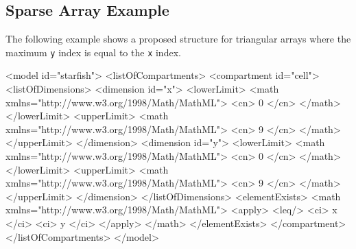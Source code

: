 \documentclass{cekarticle}
\begin{document}
\subsection{Sparse Array Example}
\label{sec:sparseeg}

The following example shows a proposed structure for triangular
arrays where the maximum \texttt{y} index is equal to the
\texttt{x} index.

\begin{example}
<model id="starfish">
    <listOfCompartments>
        <compartment id="cell">
            <listOfDimensions>
                <dimension id="x">
                    <lowerLimit>
                        <math xmlns="http://www.w3.org/1998/Math/MathML">
                            <cn> 0 </cn>
                        </math>
                    </lowerLimit>
                    <upperLimit>
                        <math xmlns="http://www.w3.org/1998/Math/MathML">
                            <cn> 9 </cn>
                        </math>
                    </upperLimit>
                </dimension>
                <dimension id="y">
                    <lowerLimit>
                        <math xmlns="http://www.w3.org/1998/Math/MathML">
                            <cn> 0 </cn>
                        </math>
                    </lowerLimit>
                    <upperLimit>
                        <math xmlns="http://www.w3.org/1998/Math/MathML">
                            <cn> 9 </cn>
                        </math>
                    </upperLimit>
                </dimension>
            </listOfDimensions>
            <elementExists>
                <math xmlns="http://www.w3.org/1998/Math/MathML">
                    <apply>
                        <leq/>
                        <ci> x </ci>
                        <ci> y </ci>
                    </apply>
                </math>
            </elementExists>
        </compartment>
    </listOfCompartments>
</model>
\end{example}
\end{document}
